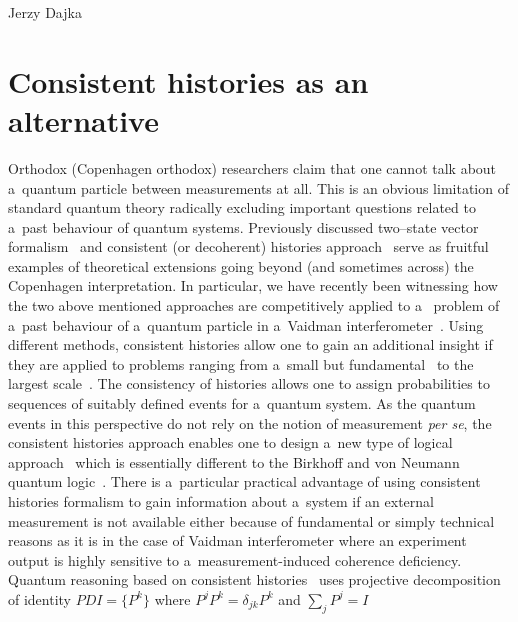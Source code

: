 \begin{artengenv}{Jerzy Dajka}

\section{Consistent histories as an alternative}  

Orthodox (Copenhagen orthodox) researchers claim that one 
cannot talk about a~quantum particle between measurements at all. This is an obvious limitation of standard quantum theory radically excluding important questions related to a~past behaviour of quantum systems.   
%
Previously discussed  two--state vector formalism~\parencite{Aharonov2008} and consistent (or decoherent) histories approach~\parencite{Griffiths,Griffiths1984,Omnes1988,Omnes1,gel1,gel} serve  as fruitful examples of theoretical extensions  going beyond (and sometimes across) the Copenhagen interpretation. In particular,  we have recently been  witnessing how  the two above mentioned approaches are competitively applied to a~ problem  of a~past behaviour of a~quantum particle in a~Vaidman interferometer~\parencite{PhysRevA.87.052104,PhysRevA.95.066101,scirep}. Using different methods, consistent histories allow one to gain an additional insight if they are applied to  problems  ranging from a~small but fundamental~\parencite{GRIFFITHS_measur,GRIFFITHS_onto,Griffiths2014,mea1} to the largest scale~\parencite{zur1,q_cosm}. The consistency of  histories  allows one
to assign probabilities to sequences of suitably defined events for a~quantum system. As the quantum events in this perspective  do  not rely on the notion of measurement {\it per se}, the consistent histories approach enables one to design a~new type of logical approach~\parencite{Griffiths1984} which is essentially different to the Birkhoff and von Neumann quantum logic~\parencite{qlog}. There is a~particular practical advantage of using consistent histories formalism to gain information about a~system if
an external measurement is not available either because of fundamental or simply technical reasons as it is in the case of  Vaidman interferometer where an experiment output is highly sensitive to a~measurement-induced coherence deficiency. 
%
Quantum reasoning based on consistent histories~\parencite{Griffiths_reason} uses projective decomposition of identity $PDI=\{P^k\}$ 
where $P^jP^k =\delta_{jk}P^k$ and $\sum_j P^j=I$

\end{artengenv}

